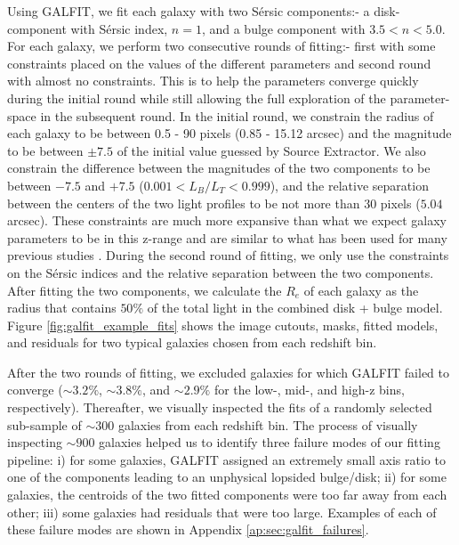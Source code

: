 \documentclass[linenumbers,twocolumn,twocolappendix]{aastex631}
\newcommand\sersic{S\'ersic}
\begin{document}
\begin{CJK*}{UTF8}{gbsn}
Using GALFIT, we fit each galaxy with two \sersic{} components:- a disk-component with \sersic{} index, $n=1$, and a bulge component with $3.5 < n < 5.0$. For each galaxy, we perform two consecutive rounds of fitting:- first with some constraints placed on the values of the different parameters and second round with almost no constraints. This is to help the parameters converge quickly during the initial round while still allowing the full exploration of the parameter-space in the subsequent round. In the initial round, we constrain the radius of each galaxy to be between 0.5 - 90 pixels (0.85 - 15.12 arcsec) and the magnitude to be between $\pm7.5$ of the initial value guessed by Source Extractor. We also constrain the difference between the magnitudes of the two components to be between $-7.5$ and $+7.5$ ($0.001 < L_B/L_T < 0.999$), and the relative separation between the centers of the two light profiles to be not more than 30 pixels ($5.04$ arcsec). These constraints are much more expansive than what we expect galaxy parameters to be in this z-range and are similar to what has been used for many previous studies \citep[e.g.,][]{vdw_12,Tuccillo2018DeepFitting}. During the second round of fitting, we only use the constraints on the \sersic{} indices and the relative separation between the two components. After fitting the two components, we calculate the $R_e$ of each galaxy as the radius that contains $50\%$ of the total light in the combined disk + bulge model. Figure \ref{fig:galfit_example_fits} shows the image cutouts, masks, fitted models, and residuals for two typical galaxies chosen from each redshift bin.

After the two rounds of fitting, we excluded galaxies for which GALFIT failed to converge ($\sim3.2\%$, $\sim3.8\%$, and $\sim2.9\%$ for the low-, mid-, and high-z bins, respectively). Thereafter, we visually inspected the fits of a randomly selected sub-sample of $\sim300$ galaxies from each redshift bin. The process of visually inspecting $\sim900$ galaxies helped us to identify three failure modes of our fitting pipeline: i) for some galaxies, GALFIT assigned an extremely small axis ratio to one of the components leading to an unphysical lopsided bulge/disk; ii) for some galaxies, the centroids of the two fitted components were too far away from each other; iii) some galaxies had residuals that were too large. Examples of each of these failure modes are shown in Appendix \ref{ap:sec:galfit_failures}.


\end{CJK*}
\end{document}

